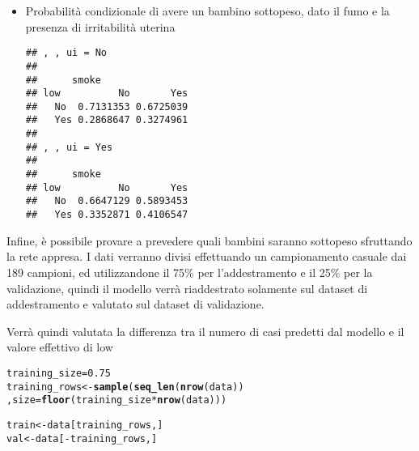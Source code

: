 \documentclass{article}\usepackage[]{graphicx}\usepackage[]{color}
\makeatletter
\newcommand{\hlnum}[1]{\textcolor[rgb]{0.686,0.059,0.569}{#1}}%
\newcommand{\hlopt}[1]{\textcolor[rgb]{0,0,0}{#1}}%
\newcommand{\hlstd}[1]{\textcolor[rgb]{0.345,0.345,0.345}{#1}}%
\newcommand{\hlkwb}[1]{\textcolor[rgb]{0.69,0.353,0.396}{#1}}%
\newcommand{\hlkwc}[1]{\textcolor[rgb]{0.333,0.667,0.333}{#1}}%
\newcommand{\hlkwd}[1]{\textcolor[rgb]{0.737,0.353,0.396}{\textbf{#1}}}%
\newenvironment{kframe}{%
 \def\at@end@of@kframe{}%
 \ifinner\ifhmode%
  \def\at@end@of@kframe{\end{minipage}}%
  \begin{minipage}{\columnwidth}%
 \fi\fi%
 \def\FrameCommand##1{\hskip\@totalleftmargin \hskip-\fboxsep
 \colorbox{shadecolor}{##1}\hskip-\fboxsep
     \hskip-\linewidth \hskip-\@totalleftmargin \hskip\columnwidth}%
 \MakeFramed {\advance\hsize-\width
   \@totalleftmargin\z@ \linewidth\hsize
   \@setminipage}}%
 {\par\unskip\endMakeFramed%
 \at@end@of@kframe}
\newenvironment{knitrout}{}{} %
\makeatother
\begin{document}
\begin{itemize}
\item Probabilità condizionale di avere un bambino sottopeso, dato il fumo e la presenza di irritabilità uterina
\begin{knitrout}
\color{fgcolor}\begin{kframe}
\begin{verbatim}
## , , ui = No
## 
##      smoke
## low          No       Yes
##   No  0.7131353 0.6725039
##   Yes 0.2868647 0.3274961
## 
## , , ui = Yes
## 
##      smoke
## low          No       Yes
##   No  0.6647129 0.5893453
##   Yes 0.3352871 0.4106547
\end{verbatim}
\end{kframe}
\end{knitrout}

\end{itemize}

Infine, è possibile provare a prevedere quali bambini saranno sottopeso sfruttando la rete appresa.
I dati verranno divisi effettuando un campionamento casuale dai 189 campioni, ed utilizzandone il 75\% per l'addestramento e il 25\% per la validazione,
quindi il modello verrà riaddestrato solamente sul dataset di addestramento e valutato sul dataset di validazione.

Verrà quindi valutata la differenza tra il numero di casi predetti dal modello e il valore effettivo di low

\begin{knitrout}
\color{fgcolor}\begin{kframe}
\begin{alltt}
\hlstd{training_size}\hlkwb{=} \hlnum{0.75}
\hlstd{training_rows} \hlkwb{<-} \hlkwd{sample}\hlstd{(}\hlkwd{seq_len}\hlstd{(}\hlkwd{nrow}\hlstd{(data))}
                        \hlstd{,} \hlkwc{size} \hlstd{=} \hlkwd{floor}\hlstd{(training_size} \hlopt{*} \hlkwd{nrow}\hlstd{(data)))}

\hlstd{train} \hlkwb{<-}\hlstd{data[training_rows,]}
\hlstd{val} \hlkwb{<-}\hlstd{data[}\hlopt{-}\hlstd{training_rows,]}
\end{alltt}
\end{kframe}
\end{knitrout}
\end{document}
